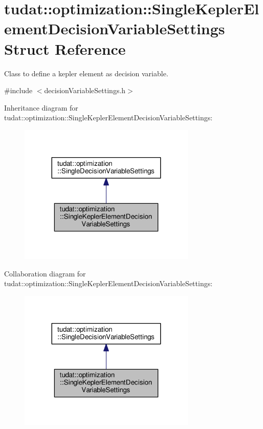 \hypertarget{structtudat_1_1optimization_1_1SingleKeplerElementDecisionVariableSettings}{}\section{tudat\+:\+:optimization\+:\+:Single\+Kepler\+Element\+Decision\+Variable\+Settings Struct Reference}
\label{structtudat_1_1optimization_1_1SingleKeplerElementDecisionVariableSettings}


Class to define a kepler element as decision variable.  




{\ttfamily \#include $<$decision\+Variable\+Settings.\+h$>$}



Inheritance diagram for tudat\+:\+:optimization\+:\+:Single\+Kepler\+Element\+Decision\+Variable\+Settings\+:
\nopagebreak
\begin{figure}[H]
\begin{center}
\leavevmode
\includegraphics[width=239pt]{structtudat_1_1optimization_1_1SingleKeplerElementDecisionVariableSettings__inherit__graph}
\end{center}
\end{figure}


Collaboration diagram for tudat\+:\+:optimization\+:\+:Single\+Kepler\+Element\+Decision\+Variable\+Settings\+:
\nopagebreak
\begin{figure}[H]
\begin{center}
\leavevmode
\includegraphics[width=239pt]{structtudat_1_1optimization_1_1SingleKeplerElementDecisionVariableSettings__coll__graph}
\end{center}
\end{figure}
